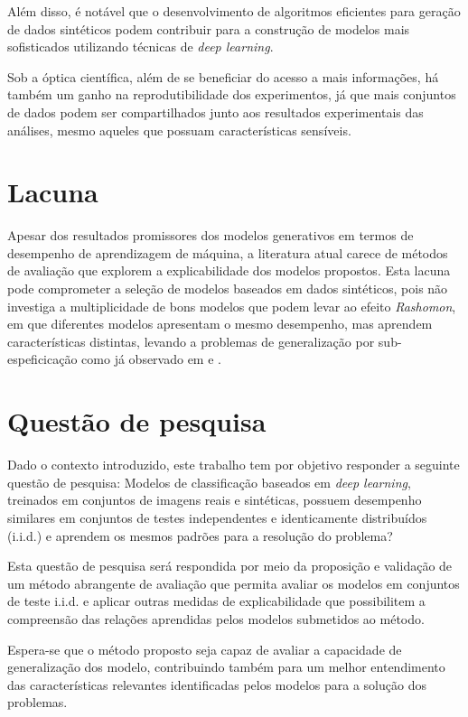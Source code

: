 Além disso, é notável que o desenvolvimento de algoritmos eficientes para geração de dados sintéticos podem contribuir para a construção de modelos mais sofisticados utilizando técnicas de \textit{deep learning}.

Sob a óptica científica, além de se beneficiar do acesso a mais informações, há também um ganho na reprodutibilidade dos experimentos, já que mais conjuntos de dados podem ser compartilhados junto aos resultados experimentais das análises, mesmo aqueles que possuam características sensíveis.


\section{Lacuna}

Apesar dos resultados promissores dos modelos generativos em termos de desempenho de aprendizagem de máquina, a literatura atual carece de métodos de avaliação que explorem a explicabilidade dos modelos propostos. Esta lacuna pode comprometer a seleção de modelos baseados em dados sintéticos, pois não investiga a multiplicidade de bons modelos que podem levar ao efeito \textit{Rashomon}, em que diferentes modelos apresentam o mesmo desempenho, mas aprendem características distintas, levando a problemas de generalização por sub-espeficicação como já observado em  e .

\section{Questão de pesquisa}

Dado o contexto introduzido, este trabalho tem por objetivo responder a seguinte questão de pesquisa: Modelos de classificação baseados em \textit{deep learning}, treinados em conjuntos de imagens reais e sintéticas, possuem desempenho similares em conjuntos de testes independentes e identicamente distribuídos (i.i.d.) e aprendem os mesmos padrões para a resolução do problema?

Esta questão de pesquisa será respondida por meio da proposição e validação de um método abrangente de avaliação que permita avaliar os modelos em conjuntos de teste i.i.d. e aplicar outras medidas de explicabilidade que possibilitem a compreensão das relações aprendidas pelos modelos submetidos ao método.

Espera-se que o método proposto seja capaz de avaliar a capacidade de generalização dos modelo, contribuindo também para um melhor entendimento das características relevantes identificadas pelos modelos para a solução dos problemas.

